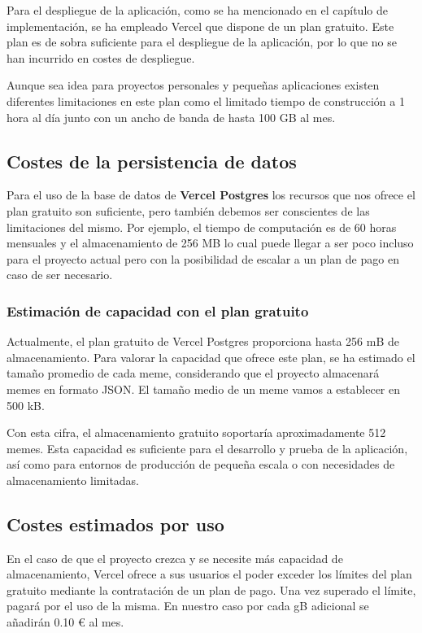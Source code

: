 Para el despliegue de la aplicación, como se ha mencionado en el capítulo de implementación, se ha empleado Vercel que dispone de un plan gratuito. Este plan es de sobra suficiente para el despliegue de la aplicación, por lo que no se han incurrido en costes de despliegue.

Aunque sea idea para proyectos personales y pequeñas aplicaciones existen diferentes limitaciones en este plan como el limitado tiempo de construcción a 1 hora al día junto con un ancho de banda de hasta 100 GB al mes.

\subsection{Costes de la persistencia de datos}

Para el uso de la base de datos de \textbf{Vercel Postgres} los recursos que nos ofrece el plan gratuito son suficiente, pero también debemos ser conscientes de las limitaciones del mismo. Por ejemplo, el tiempo de computación es de 60 horas mensuales y el almacenamiento de 256 MB lo cual puede llegar a ser poco incluso para el proyecto actual pero con la posibilidad de escalar a un plan de pago en caso de ser necesario.

\subsubsection{Estimación de capacidad con el plan gratuito}

Actualmente, el plan gratuito de Vercel Postgres proporciona hasta 256 mB de almacenamiento. Para valorar la capacidad que ofrece este plan, se ha estimado el tamaño promedio de cada meme, considerando que el proyecto almacenará memes en formato JSON. El tamaño medio de un meme vamos a establecer en 500 kB.

Con esta cifra, el almacenamiento gratuito soportaría aproximadamente 512 memes. Esta capacidad es suficiente para el desarrollo y prueba de la aplicación, así como para entornos de producción de pequeña escala o con necesidades de almacenamiento limitadas.

\subsection{Costes estimados por uso}

En el caso de que el proyecto crezca y se necesite más capacidad de almacenamiento, Vercel ofrece a sus usuarios el poder exceder los límites del plan gratuito mediante la contratación de un plan de pago. Una vez superado el límite, pagará por el uso de la misma. En nuestro caso por cada gB adicional se añadirán 0.10 € al mes.
